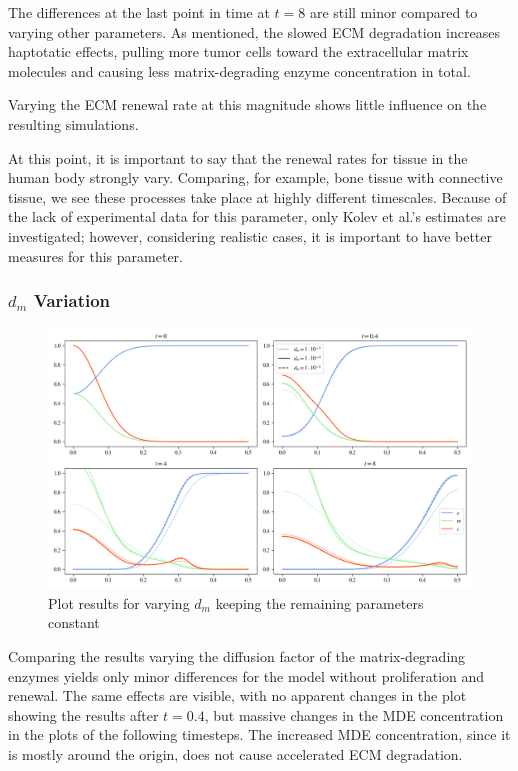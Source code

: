 The differences at the last point in time at $t=8$ are still minor compared to varying other parameters. As mentioned, the slowed ECM degradation increases haptotatic effects, pulling more tumor cells toward the extracellular matrix molecules and causing less matrix-degrading enzyme concentration in total.

Varying the ECM renewal rate at this magnitude shows little influence on the resulting simulations.
 
At this point, it is important to say that the renewal rates for tissue in the human body strongly vary. Comparing, for example, bone tissue with connective tissue, we see these processes take place at highly different timescales. Because of the lack of experimental data for this parameter, only Kolev et al.'s estimates are investigated; however, considering realistic cases, it is important to have better measures for this parameter.

\subsubsection*{$d_m$ Variation}
\begin{figure}[h!]
    \centering
    \includegraphics[width=\textwidth]{resources/images/prolif_dm_variation.png}
    \caption{Plot results for varying $d_m$ keeping the remaining parameters constant}
    \label{fig:prolif_dm_variation}
\end{figure}

Comparing the results varying the diffusion factor of the matrix-degrading enzymes yields only minor differences for the model without proliferation and renewal. The same effects are visible, with no apparent changes in the plot showing the results after $t=0.4$, but massive changes in the MDE concentration in the plots of the following timesteps. The increased MDE concentration, since it is mostly around the origin, does not cause accelerated ECM degradation.

